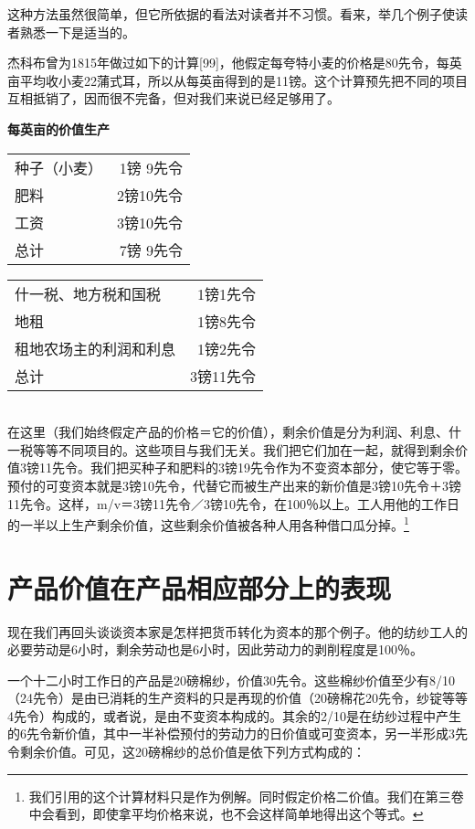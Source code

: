 \documentclass{ctexbook}
\begin{document}
    这种方法虽然很简单，但它所依据的看法对读者并不习惯。看来，举几个例子使读者熟悉一下是适当的。
    
    杰科布曾为1815年做过如下的计算[99]，他假定每夸特小麦的价格是80先令，每英亩平均收小麦22蒲式耳，所以从每英亩得到的是11镑。这个计算预先把不同的项目互相抵销了，因而很不完备，但对我们来说已经足够用了。

    \begin{center}
        \textbf{每英亩的价值生产}
    \end{center}

    \begin{tabular}{lr|}
        种子（小麦）&1镑 9先令\\
        肥料&2镑10先令\\
        工资&3镑10先令\\
        总计&7镑 9先令
    \end{tabular}
    \begin{tabular}{|lr}
        什一税、地方税和国税&1镑1先令\\
        地租&1镑8先令\\
        租地农场主的利润和利息&1镑2先令\\
        总计&3镑11先令\\
    \end{tabular}\\

    在这里（我们始终假定产品的价格＝它的价值），剩余价值是分为利润、利息、什一税等等不同项目的。这些项目与我们无关。我们把它们加在一起，就得到剩余价值3镑11先令。我们把买种子和肥料的3镑19先令作为不变资本部分，使它等于零。预付的可变资本就是3镑10先令，代替它而被生产出来的新价值是3镑10先令＋3镑11先令。这样，m/v＝3镑11先令／3镑10先令，在100％以上。工人用他的工作日的一半以上生产剩余价值，这些剩余价值被各种人用各种借口瓜分掉。\footnote{我们引用的这个计算材料只是作为例解。同时假定价格二价值。我们在第三卷中会看到，即使拿平均价格来说，也不会这样简单地得出这个等式。}

    \section{产品价值在产品相应部分上的表现}

    现在我们再回头谈谈资本家是怎样把货币转化为资本的那个例子。他的纺纱工人的必要劳动是6小时，剩余劳动也是6小时，因此劳动力的剥削程度是100％。

    一个十二小时工作日的产品是20磅棉纱，价值30先令。这些棉纱价值至少有8/10（24先令）是由已消耗的生产资料的只是再现的价值（20磅棉花20先令，纱锭等等4先令）构成的，或者说，是由不变资本构成的。其余的2/10是在纺纱过程中产生的6先令新价值，其中一半补偿预付的劳动力的日价值或可变资本，另一半形成3先令剩余价值。可见，这20磅棉纱的总价值是依下列方式构成的：
\end{document}
